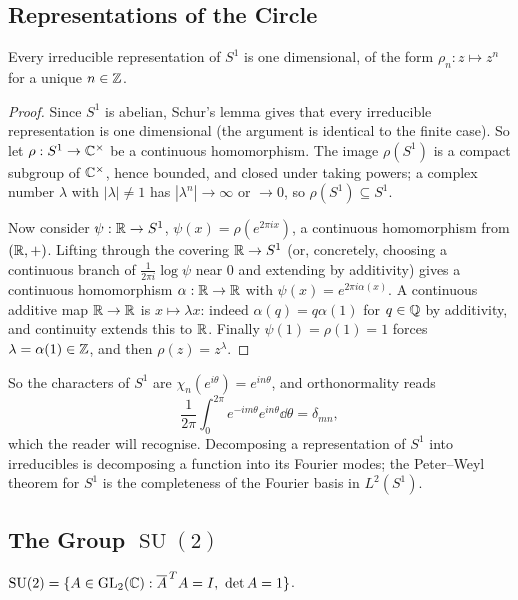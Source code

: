 \documentclass[a4paper]{scrartcl}
\newcommand{\SU}{\operatorname{SU}}
\begin{document}
\subsection{Representations of the Circle}

\begin{theorem}
	Every irreducible representation of $S^1$ is one dimensional, of the form $\rho_n : z\mapsto z^n$ for a unique $n\in\mathbb{Z}$.
\end{theorem}
\begin{proof}
	Since $S^1$ is abelian, Schur's lemma gives that every irreducible representation is one dimensional (the argument is identical to the finite case). So let $\rho : S^1\to\mathbb{C}^\times$ be a continuous homomorphism. The image $\rho(S^1)$ is a compact subgroup of $\mathbb{C}^\times$, hence bounded, and closed under taking powers; a complex number $\lambda$ with $|\lambda|\neq1$ has $|\lambda^n|\to\infty$ or $\to0$, so $\rho(S^1)\subseteq S^1$.

	Now consider $\psi : \mathbb{R}\to S^1$, $\psi(x) = \rho(e^{2\pi i x})$, a continuous homomorphism from $(\mathbb{R},+)$. Lifting through the covering $\mathbb{R}\to S^1$ (or, concretely, choosing a continuous branch of $\frac{1}{2\pi i}\log\psi$ near $0$ and extending by additivity) gives a continuous homomorphism $\alpha : \mathbb{R}\to\mathbb{R}$ with $\psi(x) = e^{2\pi i\alpha(x)}$. A continuous additive map $\mathbb{R}\to\mathbb{R}$ is $x\mapsto\lambda x$: indeed $\alpha(q) = q\alpha(1)$ for $q\in\mathbb{Q}$ by additivity, and continuity extends this to $\mathbb{R}$. Finally $\psi(1) = \rho(1) = 1$ forces $\lambda = \alpha(1)\in\mathbb{Z}$, and then $\rho(z) = z^\lambda$.
\end{proof}

So the characters of $S^1$ are $\chi_n(e^{i\theta}) = e^{in\theta}$, and orthonormality reads
$$\frac1{2\pi}\int_0^{2\pi}e^{-im\theta}e^{in\theta}\dd\theta = \delta_{mn},$$
which the reader will recognise. Decomposing a representation of $S^1$ into irreducibles is decomposing a function into its Fourier modes; the Peter--Weyl theorem for $S^1$ is the completeness of the Fourier basis in $L^2(S^1)$.

\subsection{The Group \texorpdfstring{$\SU(2)$}{SU(2)}}

\begin{definition}
	$\SU(2) = \{A\in\GL_2(\C) : \overline A^{\,T}A = I,\ \det A = 1\}$.
\end{definition}
\end{document}
